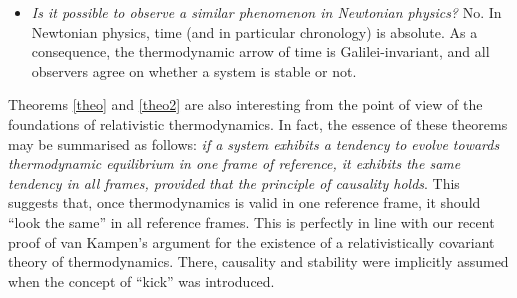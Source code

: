 \documentclass[a4paper, amsfonts, amssymb, amsmath, reprint, showkeys,  twoside, onecolumn,notitlepage,nofootinbib]{revtex4-1}
\theoremstyle{definition}
\theoremstyle{theorem}
\begin{document}
\begin{itemize}
 \item[4)] \textit{Is it possible to observe a similar phenomenon in Newtonian physics?} No. In Newtonian physics, time (and in particular chronology) is absolute. As a consequence, the thermodynamic arrow of time is Galilei-invariant, and all observers agree on whether a system is stable or not. 
\end{itemize}





Theorems \ref{theo} and \ref{theo2} are also interesting from the point of view of the foundations of relativistic thermodynamics. In fact, the essence of these theorems may be summarised as follows: \textit{if a system exhibits a tendency to evolve towards thermodynamic equilibrium in one frame of reference, it exhibits the same tendency in all frames, provided that the principle of causality holds}. This suggests that, once thermodynamics is valid in one reference frame, it should ``look the same'' in all reference frames. This is perfectly in line with our recent proof \cite{GavassinoLorentzInvariance2021} of van Kampen's argument \cite{vanKampen1968} for the existence of a relativistically covariant theory of thermodynamics. There, causality and stability were implicitly assumed when the concept of ``kick'' was introduced. 
\end{document}
